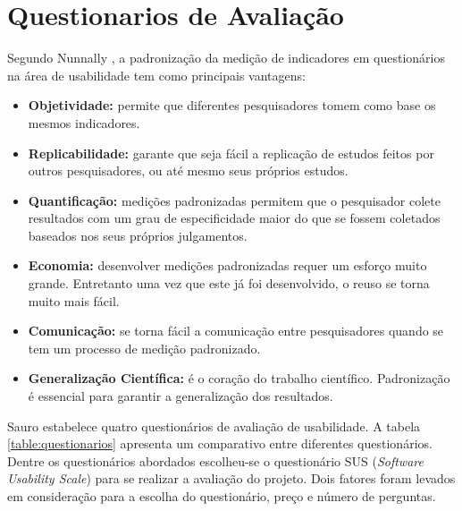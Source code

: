 \section{Questionarios de Avaliação}
Segundo Nunnally \cite{nunnally1978c}, a padronização da medição de indicadores em questionários na área de usabilidade tem como principais vantagens:
\begin{itemize}
\item \textbf{Objetividade:} permite que diferentes pesquisadores tomem como base os mesmos indicadores.
\item \textbf{Replicabilidade:} garante que seja fácil a replicação de estudos feitos por outros pesquisadores, ou até mesmo seus próprios estudos.
\item \textbf{Quantificação:} medições padronizadas permitem que o pesquisador colete resultados com um grau de especificidade maior do que se fossem coletados baseados nos seus próprios julgamentos.
\item \textbf{Economia:} desenvolver medições padronizadas requer um esforço muito grande. Entretanto uma vez que este já foi desenvolvido, o reuso se torna muito mais fácil.
\item \textbf{Comunicação:} se torna fácil a comunicação entre pesquisadores quando se tem um processo de medição  padronizado.
\item \textbf{Generalização Científica:} é o coração do trabalho científico. Padronização é essencial para garantir a generalização dos resultados.

\end{itemize}
 
Sauro \cite{sauro2016quantifying} estabelece quatro questionários de avaliação de usabilidade. A tabela \ref{table:questionarios} apresenta um comparativo entre diferentes questionários. Dentre os questionários abordados escolheu-se o questionário SUS (\textit{Software Usability Scale}) para se realizar a avaliação do projeto. Dois fatores foram levados em consideração para a escolha do questionário, preço e número de perguntas. 

